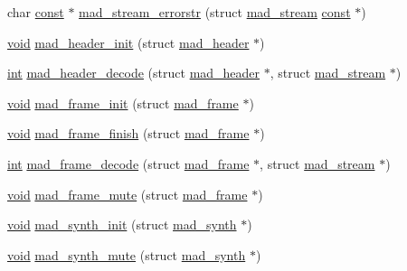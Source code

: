 \begin{DoxyCompactItemize}
\item 
char \hyperlink{getopt1_8c_a2c212835823e3c54a8ab6d95c652660e}{const} $\ast$ \hyperlink{mac_2config_2i386_2lib-src_2libmad_2mad_8h_a205370e53b1066e7de4aae43b794ef2e}{mad\+\_\+stream\+\_\+errorstr} (struct \hyperlink{structmad__stream}{mad\+\_\+stream} \hyperlink{getopt1_8c_a2c212835823e3c54a8ab6d95c652660e}{const} $\ast$)
\item 
\hyperlink{sound_8c_ae35f5844602719cf66324f4de2a658b3}{void} \hyperlink{mac_2config_2i386_2lib-src_2libmad_2mad_8h_a5e6a310d0e929761f5498bf7a7f23566}{mad\+\_\+header\+\_\+init} (struct \hyperlink{structmad__header}{mad\+\_\+header} $\ast$)
\item 
\hyperlink{xmltok_8h_a5a0d4a5641ce434f1d23533f2b2e6653}{int} \hyperlink{mac_2config_2i386_2lib-src_2libmad_2mad_8h_ac98c06c5e85cb8c0842b0383096f9ee9}{mad\+\_\+header\+\_\+decode} (struct \hyperlink{structmad__header}{mad\+\_\+header} $\ast$, struct \hyperlink{structmad__stream}{mad\+\_\+stream} $\ast$)
\item 
\hyperlink{sound_8c_ae35f5844602719cf66324f4de2a658b3}{void} \hyperlink{mac_2config_2i386_2lib-src_2libmad_2mad_8h_a3c78ba961e454462c18cfeba70d1137c}{mad\+\_\+frame\+\_\+init} (struct \hyperlink{structmad__frame}{mad\+\_\+frame} $\ast$)
\item 
\hyperlink{sound_8c_ae35f5844602719cf66324f4de2a658b3}{void} \hyperlink{mac_2config_2i386_2lib-src_2libmad_2mad_8h_a92fbcef46fd20f35426f5ad0853a8649}{mad\+\_\+frame\+\_\+finish} (struct \hyperlink{structmad__frame}{mad\+\_\+frame} $\ast$)
\item 
\hyperlink{xmltok_8h_a5a0d4a5641ce434f1d23533f2b2e6653}{int} \hyperlink{mac_2config_2i386_2lib-src_2libmad_2mad_8h_abcee46b2b808ebf6e0d1c3748b590a38}{mad\+\_\+frame\+\_\+decode} (struct \hyperlink{structmad__frame}{mad\+\_\+frame} $\ast$, struct \hyperlink{structmad__stream}{mad\+\_\+stream} $\ast$)
\item 
\hyperlink{sound_8c_ae35f5844602719cf66324f4de2a658b3}{void} \hyperlink{mac_2config_2i386_2lib-src_2libmad_2mad_8h_a1c0f45d2bbf2b433bc18159a01639b68}{mad\+\_\+frame\+\_\+mute} (struct \hyperlink{structmad__frame}{mad\+\_\+frame} $\ast$)
\item 
\hyperlink{sound_8c_ae35f5844602719cf66324f4de2a658b3}{void} \hyperlink{mac_2config_2i386_2lib-src_2libmad_2mad_8h_a17758012effd02195edac57db0480cec}{mad\+\_\+synth\+\_\+init} (struct \hyperlink{structmad__synth}{mad\+\_\+synth} $\ast$)
\item 
\hyperlink{sound_8c_ae35f5844602719cf66324f4de2a658b3}{void} \hyperlink{mac_2config_2i386_2lib-src_2libmad_2mad_8h_a2420929ab84b250fc2aaef25ccda6849}{mad\+\_\+synth\+\_\+mute} (struct \hyperlink{structmad__synth}{mad\+\_\+synth} $\ast$)

\end{DoxyCompactItemize}
